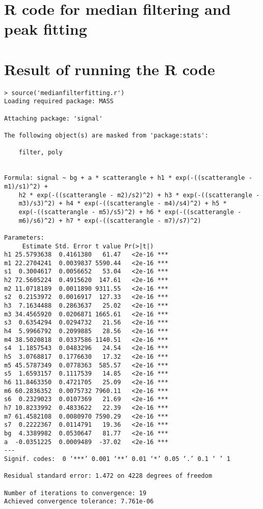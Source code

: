 \documentclass{article}
\begin{document}
\section{R code for median filtering and peak fitting}


\section{Result of running the R code}
\begin{lstlisting}
> source('medianfilterfitting.r')
Loading required package: MASS

Attaching package: 'signal'

The following object(s) are masked from 'package:stats':

    filter, poly


Formula: signal ~ bg + a * scatterangle + h1 * exp(-((scatterangle - m1)/s1)^2) + 
    h2 * exp(-((scatterangle - m2)/s2)^2) + h3 * exp(-((scatterangle - 
    m3)/s3)^2) + h4 * exp(-((scatterangle - m4)/s4)^2) + h5 * 
    exp(-((scatterangle - m5)/s5)^2) + h6 * exp(-((scatterangle - 
    m6)/s6)^2) + h7 * exp(-((scatterangle - m7)/s7)^2)

Parameters:
     Estimate Std. Error t value Pr(>|t|)    
h1 25.5793638  0.4161380   61.47   <2e-16 ***
m1 22.2704241  0.0039837 5590.44   <2e-16 ***
s1  0.3004617  0.0056652   53.04   <2e-16 ***
h2 72.5605224  0.4915620  147.61   <2e-16 ***
m2 11.0718189  0.0011890 9311.55   <2e-16 ***
s2  0.2153972  0.0016917  127.33   <2e-16 ***
h3  7.1634488  0.2863637   25.02   <2e-16 ***
m3 34.4565920  0.0206871 1665.61   <2e-16 ***
s3  0.6354294  0.0294732   21.56   <2e-16 ***
h4  5.9966792  0.2099885   28.56   <2e-16 ***
m4 38.5020818  0.0337586 1140.51   <2e-16 ***
s4  1.1857543  0.0483296   24.54   <2e-16 ***
h5  3.0768817  0.1776630   17.32   <2e-16 ***
m5 45.5787349  0.0778363  585.57   <2e-16 ***
s5  1.6593157  0.1117539   14.85   <2e-16 ***
h6 11.8463350  0.4721705   25.09   <2e-16 ***
m6 60.2836352  0.0075732 7960.11   <2e-16 ***
s6  0.2329023  0.0107369   21.69   <2e-16 ***
h7 10.8233992  0.4833622   22.39   <2e-16 ***
m7 61.4582108  0.0080970 7590.29   <2e-16 ***
s7  0.2222367  0.0114791   19.36   <2e-16 ***
bg  4.3389982  0.0530647   81.77   <2e-16 ***
a  -0.0351225  0.0009489  -37.02   <2e-16 ***
---
Signif. codes:  0 ‘***’ 0.001 ‘**’ 0.01 ‘*’ 0.05 ‘.’ 0.1 ‘ ’ 1 

Residual standard error: 1.472 on 4228 degrees of freedom

Number of iterations to convergence: 19 
Achieved convergence tolerance: 7.761e-06 


\end{lstlisting}
\end{document}
